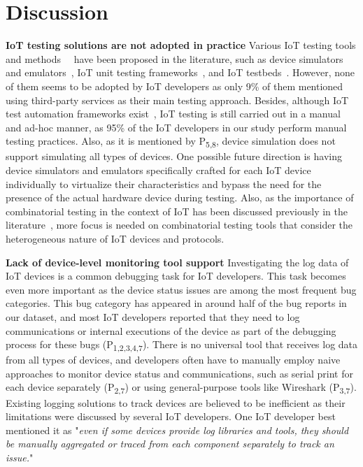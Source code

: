 {\section{Discussion}
\textbf{IoT testing solutions are not adopted in practice}
Various IoT testing tools and methods~\cite{testingtools2018}~\cite{pontes2018test} have been proposed in the literature, such as device simulators~\cite{iotify} and emulators~\cite{looga2012mammoth}, IoT unit testing frameworks~\cite{ArduinoUnit,platformio}, and IoT testbeds~\cite{iottestbed}. However, none of them seems to be adopted by IoT developers as only 9\% of them mentioned using third-party services as their main testing approach. Besides, although IoT test automation frameworks exist~\cite{iotify}, IoT testing is still carried out in a manual and ad-hoc manner, as 95\% of the IoT developers in our study perform manual testing practices. Also, as it is mentioned by P\textsubscript{5,8}, device simulation does not support simulating all types of devices. One possible future direction is having device simulators and emulators specifically crafted for each IoT device individually to virtualize their characteristics and bypass the need for the presence of the actual hardware device during testing. Also, as the importance of combinatorial testing in the context of IoT has been discussed previously in the literature~\cite{voas2018testing}, more focus is needed on combinatorial testing tools that consider the heterogeneous nature of IoT devices and protocols.

\textbf{Lack of device-level monitoring tool support}
Investigating the log data of IoT devices is a common debugging task for IoT developers. This task becomes even more important as the device status issues are among the most frequent bug categories. This bug category has appeared in around half of the bug reports in our dataset, and most IoT developers reported that they need to log communications or internal executions of the device as part of the debugging process for these bugs (P\textsubscript{1,2,3,4,7}). There is no universal tool that receives log data from all types of devices, and developers often have to manually employ naive approaches to monitor device status and communications, such as serial print for each device separately (P\textsubscript{2,7}) or using general-purpose tools like Wireshark (P\textsubscript{3,7}). Existing logging solutions to track devices are believed to be inefficient as their limitations were discussed by several IoT developers. One IoT developer best mentioned it as "\emph{even if some devices provide log libraries and tools, they should be manually aggregated or traced from each component separately to track an issue.}"

}
